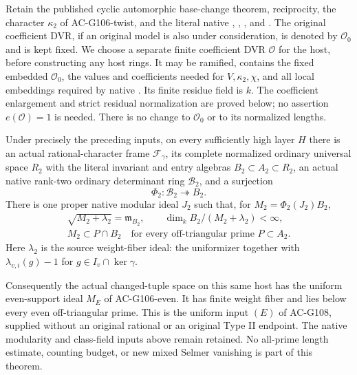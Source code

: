 Retain the published cyclic automorphic base-change theorem,
reciprocity, the character \(\kappa_2\) of AC-G106-twist, and
the literal native , ,
, and .  The original coefficient DVR,
if an original model is also under consideration, is denoted
by \(\mathcal O_0\) and is kept fixed.  We choose a separate
finite coefficient DVR \(\mathcal O\) for the host, before
constructing any host rings.  It may be ramified, contains
the fixed embedded \(\mathcal O_0\), the values and coefficients
needed for \(V,\kappa_2,\chi\), and all local embeddings required
by native .  Its finite residue field is \(k\).
The coefficient enlargement and strict residual normalization
are proved below; no assertion \(e(\mathcal O)=1\) is needed.
There is no change to \(\mathcal O_0\) or to its normalized lengths.

\begin{theorem}
\label{AC-G121-auxiliary-support}
Under precisely the preceding inputs, on every sufficiently high
layer \(H\) there is an actual rational-character frame
\(\mathcal F_\gamma\), its complete normalized ordinary universal
space \(R_2\) with the literal invariant and entry algebras
\(B_2\subset A_2\subset R_2\), an actual native rank-two ordinary
determinant ring \(\mathscr B_2\), and a surjection
\[
                 \Phi_2:\mathscr B_2\twoheadrightarrow B_2 .
 \tag{AS.4}
\]
There is one proper native modular ideal \(J_2\) such that,
for \(M_2=\Phi_2(J_2)B_2\),
\[
 \begin{gathered}
 \sqrt{M_2+\lambda_2}=\mathfrak m_{B_2},\qquad
 \dim_k B_2/(M_2+\lambda_2)<\infty,\\
 M_2\subset P\cap B_2
 \quad\text{for every off-triangular prime }P\subset A_2 .
 \end{gathered}
 \tag{AS.5}
\]
Here \(\lambda_2\) is the source weight-fiber ideal: the
uniformizer together with \(\lambda_{v,i}(g)-1\) for
\(g\in I_v\cap\ker\gamma\).

Consequently the actual changed-tuple space on this same host has
the uniform even-support ideal \(M_E\) of AC-G106-even.
It has finite weight fiber and lies below every even
off-triangular prime.  This is the uniform input \((E)\)
of AC-G108, supplied without an original rational
 or an original Type II endpoint.
The native modularity and class-field inputs above remain retained.
No all-prime length estimate, counting budget, or new mixed
Selmer vanishing is part of this theorem.
\end{theorem}


